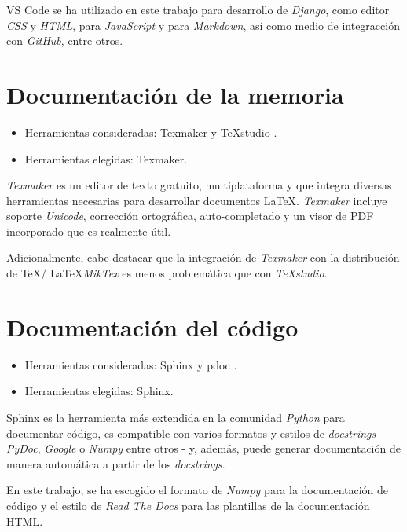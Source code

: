 VS Code se ha utilizado en este trabajo para desarrollo de \emph{Django}, como editor 
\emph{CSS} y \emph{HTML}, para \emph{JavaScript} y para \emph{Markdown}, así como medio de integracción con \emph{GitHub}, entre otros. 


\section{Documentación de la memoria}\label{editor_texto}

\begin{itemize}
\tightlist
\item
  Herramientas consideradas: Texmaker \citep{online:texmaker} y TeXstudio \citep{online:texstudio}.
\item
  Herramientas elegidas: Texmaker. 
\end{itemize}

\emph{Texmaker} es un editor de texto gratuito, multiplataforma y que integra diversas
herramientas necesarias para desarrollar documentos \LaTeX. \emph{Texmaker} incluye soporte 
\emph{Unicode}, corrección ortográfica, auto-completado y un visor de PDF incorporado que es
realmente útil. 

Adicionalmente, cabe destacar que la integración de \emph{Texmaker} con la distribución 
de \TeX / \LaTeX \emph{MikTex} \citep{wiki:miktex} es menos problemática que con \emph{TeXstudio}. 


\section{Documentación del código}\label{editor_texto}

\begin{itemize}
\tightlist
\item
  Herramientas consideradas: Sphinx \citep{online:sphinx} y pdoc \citep{online:pdoc}.
\item
  Herramientas elegidas: Sphinx. 
\end{itemize}

Sphinx es la herramienta más extendida en la comunidad \emph{Python} para documentar código,
es compatible con varios formatos y estilos de \emph{docstrings} - \emph{PyDoc}, \emph{Google} o \emph{Numpy} entre otros - y, además, puede generar documentación de manera automática a partir de los \emph{docstrings}. 

En este trabajo, se ha escogido el formato de \emph{Numpy} para la documentación de código y el estilo de \emph{Read The Docs} para las plantillas de la documentación HTML. 


